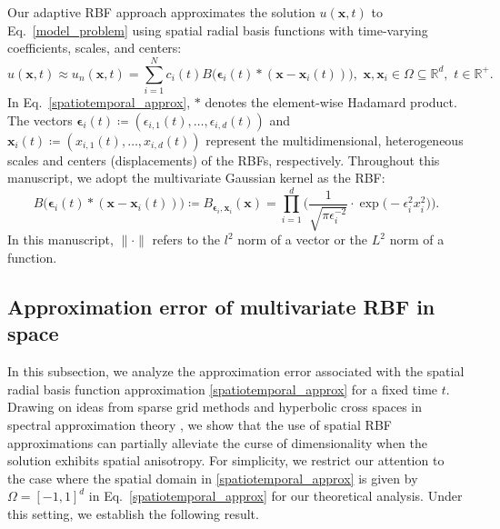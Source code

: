 Our adaptive RBF approach approximates the solution $u(\bm{x}, t)$ to Eq.~\eqref{model_problem} using spatial radial basis functions with time-varying coefficients, scales, and centers:
\begin{equation}
    u(\bm{x}, t)\approx u_n(\bm{x}, t)= \sum_{i=1}^N c_i(t)B\big(\bm{\epsilon}_i(t)*(\bm{x}-\bm{x}_i(t))\big), \,\, \bm{x},\bm{x}_i\in\Omega\subseteq \mathbb{R}^d,\,\, t\in\mathbb{R}^+.
    \label{spatiotemporal_approx}
\end{equation}
In Eq.~\eqref{spatiotemporal_approx}, $*$ denotes the element-wise Hadamard product. The vectors $\bm{\epsilon}_i(t)\coloneqq (\epsilon_{i,1}(t),\ldots,\epsilon_{i,d}(t))$ and $\bm{x}_i(t)\coloneqq (x_{i,1}(t),\ldots,x_{i,d}(t))$ represent the multidimensional, heterogeneous scales and centers (displacements) of the RBFs, respectively. Throughout this manuscript, we adopt the multivariate Gaussian kernel as the RBF:
\begin{equation}
    B\big(\bm{\epsilon}_i(t)*(\bm{x}-\bm{x}_i(t))\big)\coloneqq B_{\bm{\epsilon}_i, \bm{x}_i}(\bm{x})=\prod_{i=1}^d\Big(\frac{1}{\sqrt{\pi\epsilon_i^{-2}}}\cdot \exp\big(-\epsilon_i^2{x}_i^2\big)\Big). 
\end{equation}
In this manuscript, $\|\cdot\|$ refers to the $l^2$ norm of a vector or the $L^2$ norm of a function. %



\subsection{Approximation error of multivariate RBF in space}
In this subsection, we analyze the approximation error associated with the spatial radial basis function approximation \eqref{spatiotemporal_approx} for a fixed time $t$. Drawing on ideas from sparse grid methods and hyperbolic cross spaces in spectral approximation theory \cite{shen2010sparse,barthelmann2000high}, we show that the use of spatial RBF approximations can partially alleviate the curse of dimensionality when the solution exhibits spatial anisotropy. For simplicity, we restrict our attention to the case where the spatial domain in \eqref{spatiotemporal_approx} is given by $\Omega=[-1, 1]^d$ in Eq.~\eqref{spatiotemporal_approx} for our theoretical analysis. Under this setting, we establish the following result.



